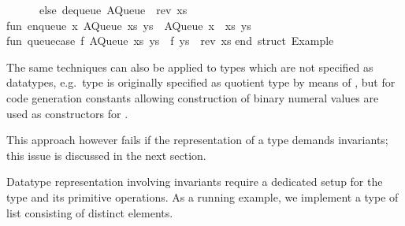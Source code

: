 \begin{isabellebody}
\begin{isamarkuptext}
\ \ \ \ \ \ else\ dequeue\ {}AQueue\ {}{}{}{}\ rev\ xs{}{}{}{}\isanewline
\isanewline
fun\ enqueue\ x\ {}AQueue\ {}xs{}\ ys{}{}\ {}\ AQueue\ {}x\ {}{}\ xs{}\ ys{}{}\isanewline
\isanewline
fun\ queue{}case\ f\ {}AQueue\ {}xs{}\ ys{}{}\ {}\ f\ {}ys\ {}\ rev\ xs{}{}\isanewline
\isanewline
end{}\ {}{}struct\ Example{}{}\isanewline%
\end{isamarkuptext}%
\isamarkuptrue%
%
\endisatagquotetypewriter
{\isafoldquotetypewriter}%
%
\isadelimquotetypewriter
%
\endisadelimquotetypewriter
%
\begin{isamarkuptext}%
The same techniques can also be applied to types which are not
  specified as datatypes, e.g.~type  is originally specified
  as quotient type by means of \hypertarget{command.typedef}{\hyperlink{command.typedef}{\mbox{}}}, but for code
  generation constants allowing construction of binary numeral values
  are used as constructors for .

  This approach however fails if the representation of a type demands
  invariants; this issue is discussed in the next section.%
\end{isamarkuptext}%
\isamarkuptrue%
%
\isamarkuptrue%
%
\begin{isamarkuptext}%
Datatype representation involving invariants require a dedicated
  setup for the type and its primitive operations.  As a running
  example, we implement a type  of list consisting
  of distinct elements.


\end{isamarkuptext}
\end{isabellebody}
